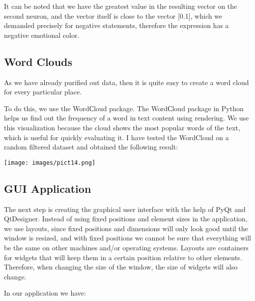 \documentclass[]{article}
\begin{document}
\vspace{2mm}
It can be noted that we have the greatest value in the resulting vector on the second neuron, and the vector itself is close to the vector [0.1], which we demanded precisely for negative statements, therefore the expression has a negative emotional color.

\vspace{3mm}
\subsection{Word Clouds}
As we have already purified out data, then it is quite easy to create a word cloud for every particular place.

To do this, we use the WordСloud package. The WordСloud package in Python helps us find out the frequency of a word in text content using rendering. We use this visualization because the cloud shows the most popular words of the text, which is useful for quickly evaluating it.
I have tested the WordCloud on a random filtered dataset and obtained the following result:

\vspace{2mm}
\texttt{[image: images/pict14.png]}

\subsection{GUI Application}
The next step is creating the graphical user interface with the help of PyQt and QtDesigner.
Instead of using fixed positions and element sizes in the application, we use layouts, since fixed positions and dimensions will only look good until the window is resized, and with fixed positions we cannot be sure that everything will be the same on other machines and/or operating systems. Layouts are containers for widgets that will keep them in a certain position relative to other elements. Therefore, when changing the size of the window, the size of widgets will also change.

\vspace{2mm}
In our application we have:
\end{document}
